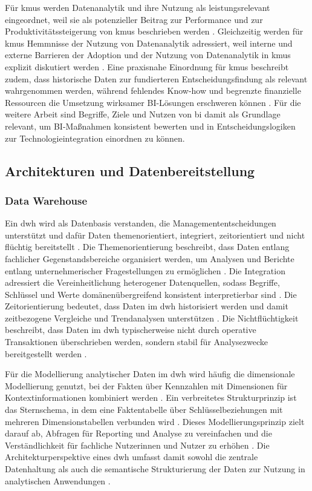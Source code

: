 Für \glspl{kmu} werden Datenanalytik und ihre Nutzung als leistungsrelevant eingeordnet, weil sie als potenzieller Beitrag zur Performance und zur Produktivitätssteigerung von \glspl{kmu} beschrieben werden \cite{OECDDataAnalyticsSMEs}. Gleichzeitig werden für \glspl{kmu} Hemmnisse der Nutzung von Datenanalytik adressiert, weil interne und externe Barrieren der Adoption und der Nutzung von Datenanalytik in \glspl{kmu} explizit diskutiert werden \cite{OECDDataAnalyticsSMEs}. Eine praxisnahe Einordnung für \glspl{kmu} beschreibt zudem, dass historische Daten zur fundierteren Entscheidungsfindung als relevant wahrgenommen werden, während fehlendes Know-how und begrenzte finanzielle Ressourcen die Umsetzung wirksamer BI-Lösungen erschweren können \cite{Raj2018SMECaseStudy}. 
Für die weitere Arbeit sind Begriffe, Ziele und Nutzen von \gls{bi} damit als Grundlage relevant, um BI-Maßnahmen konsistent bewerten und in Entscheidungslogiken zur Technologieintegration einordnen zu können.


\subsection{Architekturen und Datenbereitstellung}

\subsubsection{Data Warehouse}
Ein \gls{dwh} wird als Datenbasis verstanden, die Managemententscheidungen unterstützt und dafür Daten themenorientiert, integriert, zeitorientiert und nicht flüchtig bereitstellt \cite{Inmon1996}. Die Themenorientierung beschreibt, dass Daten entlang fachlicher Gegenstandsbereiche organisiert werden, um Analysen und Berichte entlang unternehmerischer Fragestellungen zu ermöglichen \cite{Inmon1996}. Die Integration adressiert die Vereinheitlichung heterogener Datenquellen, sodass Begriffe, Schlüssel und Werte domänenübergreifend konsistent interpretierbar sind \cite{OracleDWHConcepts}. Die Zeitorientierung bedeutet, dass Daten im \gls{dwh} historisiert werden und damit zeitbezogene Vergleiche und Trendanalysen unterstützen \cite{Inmon1996}. Die Nichtflüchtigkeit beschreibt, dass Daten im \gls{dwh} typischerweise nicht durch operative Transaktionen überschrieben werden, sondern stabil für Analysezwecke bereitgestellt werden \cite{OracleDWHConcepts}. 

Für die Modellierung analytischer Daten im \gls{dwh} wird häufig die dimensionale Modellierung genutzt, bei der Fakten über Kennzahlen mit Dimensionen für Kontextinformationen kombiniert werden \cite{KimballRoss2013}. Ein verbreitetes Strukturprinzip ist das Sternschema, in dem eine Faktentabelle über Schlüsselbeziehungen mit mehreren Dimensionstabellen verbunden wird \cite{KimballRoss2013}. Dieses Modellierungsprinzip zielt darauf ab, Abfragen für Reporting und Analyse zu vereinfachen und die Verständlichkeit für fachliche Nutzerinnen und Nutzer zu erhöhen \cite{KimballRoss2013}. Die Architekturperspektive eines \gls{dwh} umfasst damit sowohl die zentrale Datenhaltung als auch die semantische Strukturierung der Daten zur Nutzung in analytischen Anwendungen \cite{BaarsKemper2021}. 

